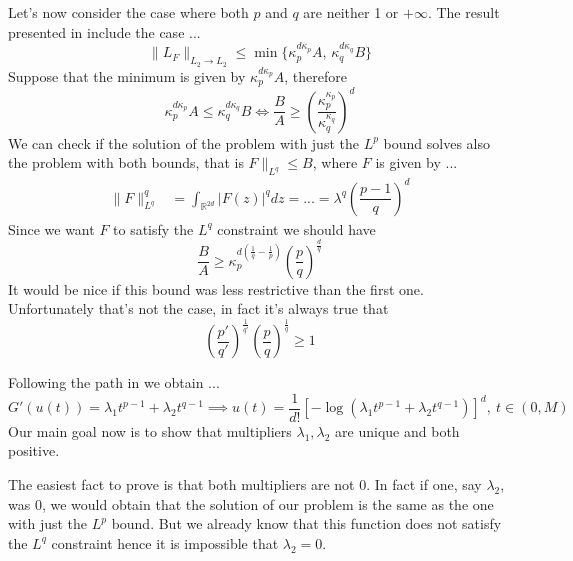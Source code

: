 \documentclass[corpo=11pt, stile=classica, tipotesi=custom,
greek, evenboxes, english]{toptesi}
\numberwithin{equation}{chapter}
\newcommand{\R}{\mathbb{R}} %
\begin{document}
Let's now consider the case where both $p$ and $q$ are neither 1 or $+\infty$. The result presented in \cite{nicolatilli_norm} include the case ...
\begin{equation*}
	\| L_F\|_{L_2 \rightarrow L_2} \leq \min\{\kappa_p^{d\kappa_p}A, \, \kappa_q^{d\kappa_q}B\}
\end{equation*}
Suppose that the minimum is given by $\kappa_p^{d\kappa_p}A$, therefore
\begin{equation*}
	\kappa_p^{d\kappa_p}A \leq \kappa_q^{d\kappa_q}B \iff \dfrac{B}{A} \geq \left(\dfrac{\kappa_p^{\kappa_p}}{\kappa_q^{\kappa_q}}\right)^d
\end{equation*}
We can check if the solution of the problem with just the $L^p$ bound solves also the problem with both bounds, that is $F\|_{L^q} \leq B$, where $F$ is given by ...
\begin{align*}
	\| F \|_{L^q}^q &= \int_{\R^{2d}} |F(z)|^q dz = ... = \lambda^q \left(\dfrac{p-1}{q}\right)^d
\end{align*}
Since we want $F$ to satisfy the $L^q$ constraint we should have
\begin{equation*}
	\dfrac{B}{A} \geq \kappa_p^{d\left(\frac1q - \frac1p\right)}\left(\dfrac{p}{q}\right)^{\frac{d}{q}}
\end{equation*}
It would be nice if this bound was less restrictive than the first one. Unfortunately that's not the case, in fact it's always true that
\begin{equation*}
	\left(\dfrac{p'}{q'}\right)^{\frac1{q'}} \left(\dfrac{p}{q}\right)^{\frac1q} \geq 1
\end{equation*}

Following the path in \cite{nicolatilli_norm} we obtain ...\\
\begin{equation*}
	G'(u(t)) = \lambda_1 t^{p-1} + \lambda_2 t^{q-1} \implies u(t) = \dfrac{1}{d!}\left[-\log\left(\lambda_1 t^{p-1} + \lambda_2 t^{q-1}\right)\right]^d, \ t \in (0,M)
\end{equation*}
Our main goal now is to show that multipliers $\lambda_1, \lambda_2$ are unique and both positive.

The easiest fact to prove is that both multipliers are not 0. In fact if one, say $\lambda_2$, was 0, we would obtain that the solution of our problem is the same as the one with just the $L^p$ bound. But we already know that this function does not satisfy the $L^q$ constraint hence it is impossible that $\lambda_2=0$.
\end{document}
